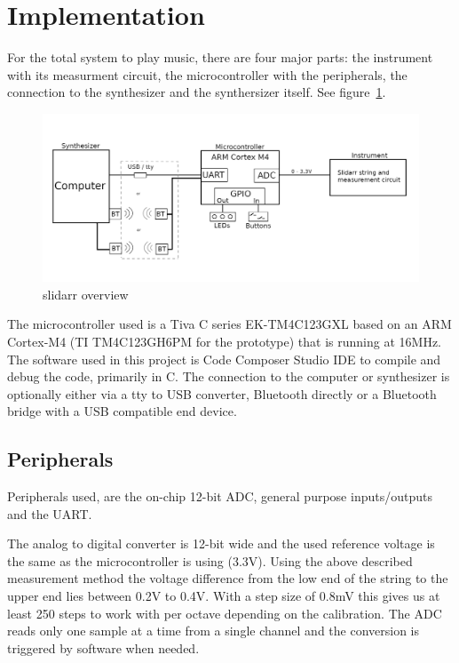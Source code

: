 \documentclass{article}
\begin{document}
\section{Implementation}

For the total system to play music, there are four major parts: the instrument with its measurment circuit, the microcontroller with the peripherals, the connection to the synthesizer and the synthersizer itself. See figure~\ref{fig:slidarr overview}.

\begin{figure}[ht]
  \centering
  \includegraphics[width=1\textwidth]{BasicSystemOverview.png}
  \caption{slidarr overview}
  \label{fig:slidarr overview}
\end{figure}

The microcontroller used is a Tiva C series EK-TM4C123GXL based on an ARM Cortex-M4 (TI TM4C123GH6PM for the prototype) that is running at 16MHz. The software used in this project is Code Composer Studio IDE to compile and debug the code, primarily in C. The connection to the computer or synthesizer is optionally either via a tty to USB converter, Bluetooth directly or a Bluetooth bridge with a USB compatible end device.

\subsection{Peripherals}
Peripherals used, are the on-chip 12-bit ADC, general purpose inputs/outputs and the UART.

The analog to digital converter is 12-bit wide and the used reference voltage is the same as the microcontroller is using (3.3V). Using the above described measurement method the voltage difference from the low end of the string to the upper end lies between 0.2V to 0.4V. With a step size of 0.8mV this gives us at least 250 steps to work with per octave depending on the calibration. The ADC reads only one sample at a time from a single channel and the conversion is triggered by software when needed.
\end{document}
